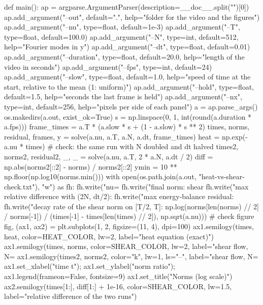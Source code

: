 \documentclass[11pt]{article}
\makeatletter
\theoremstyle{definition}
\theoremstyle{remark}
\newenvironment{note}[1][Note]{\begin{tcolorbox}[ed@note]\noindent{\itshape#1\@addpunct{.}}\enspace\ignorespaces}{\end{tcolorbox}}
\makeatother
\begin{document}
\begin{note}[Code]
\begin{wikicode}[python]
def main():
    ap = argparse.ArgumentParser(description=__doc__.split("\n")[0])
    ap.add_argument("--out", default=".", help="folder for the video and the figures")
    ap.add_argument("--nu", type=float, default=1e-3)
    ap.add_argument("--T", type=float, default=100.0)
    ap.add_argument("--N", type=int, default=512, help="Fourier modes in y")
    ap.add_argument("--dt", type=float, default=0.01)
    ap.add_argument("--duration", type=float, default=20.0, help="length of the video in seconds")
    ap.add_argument("--fps", type=int, default=24)
    ap.add_argument("--slow", type=float, default=1.0, help="speed of time at the start, relative to the mean (1: uniform)")
    ap.add_argument("--hold", type=float, default=1.5, help="seconds the last frame is held")
    ap.add_argument("--nx", type=int, default=256, help="pixels per side of each panel")
    a = ap.parse_args()
    os.makedirs(a.out, exist_ok=True)
    s = np.linspace(0, 1, int(round(a.duration * a.fps)))
    frame_times = a.T * (a.slow * s + (1 - a.slow) * s ** 2)
    times, norms, residual, frames, y = solve(a.nu, a.T, a.N, a.dt, frame_times)
    heat = np.exp(-a.nu * times)
    # check: the same run with N doubled and dt halved
    times2, norms2, residual2, _, _ = solve(a.nu, a.T, 2 * a.N, a.dt / 2)
    diff = np.abs(norms2[::2] - norms) / norms2[::2]
    ymin = 10 ** np.floor(np.log10(norms.min()))
    with open(os.path.join(a.out, "heat-vs-shear-check.txt"), "w") as fh:
        fh.write("nu=%
        fh.write("final norm: shear %
        fh.write("max relative difference with (2N, dt/2): %
        fh.write("max energy-balance residual: %
        fh.write("decay rate of the shear norm on [T/2, T]: %
            np.log(norms[len(norms) // 2] / norms[-1]) / (times[-1] - times[len(times) // 2]), np.sqrt(a.nu)))
    # check figure
    fig, (ax1, ax2) = plt.subplots(1, 2, figsize=(11, 4), dpi=100)
    ax1.semilogy(times, heat, color=HEAT_COLOR, lw=2, label="heat equation (exact)")
    ax1.semilogy(times, norms, color=SHEAR_COLOR, lw=2, label="shear flow, N=%
    ax1.semilogy(times2, norms2, color="k", lw=1, ls="--", label="shear flow, N=%
    ax1.set_xlabel("time t"); ax1.set_ylabel("norm ratio"); ax1.legend(frameon=False, fontsize=9)
    ax1.set_title("Norms (log scale)")
    ax2.semilogy(times[1:], diff[1:] + 1e-16, color=SHEAR_COLOR, lw=1.5, label="relative difference of the two runs")

\end{wikicode}
\end{note}
\end{document}
